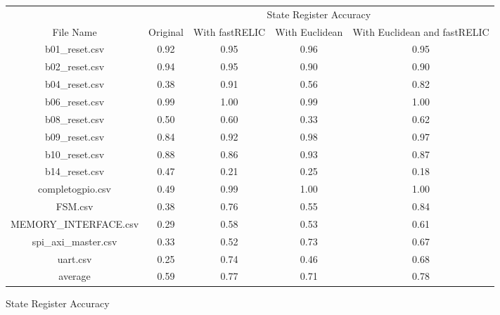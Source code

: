 \bigskip\begin{tabular}{|c|c|c|c|c|}
    \hline
     & \multicolumn{4}{c|}{State Register Accuracy }\\
    \cline {2-5}
    File Name & Original & With fastRELIC & With Euclidean & With Euclidean and fastRELIC\\
    \hline
    \hline
    b01\_reset.csv & 0.92 & 0.95 & 0.96 & 0.95\\
    \hline
    b02\_reset.csv & 0.94 & 0.95 & 0.90 & 0.90\\
    \hline
    b04\_reset.csv & 0.38 & 0.91 & 0.56 & 0.82\\
    \hline
    b06\_reset.csv & 0.99 & 1.00 & 0.99 & 1.00\\
    \hline
    b08\_reset.csv & 0.50 & 0.60 & 0.33 & 0.62\\
    \hline
    b09\_reset.csv & 0.84 & 0.92 & 0.98 & 0.97\\
    \hline
    b10\_reset.csv & 0.88 & 0.86 & 0.93 & 0.87\\
    \hline
    b14\_reset.csv & 0.47 & 0.21 & 0.25 & 0.18\\
    \hline
    completogpio.csv & 0.49 & 0.99 & 1.00 & 1.00\\
    \hline
    FSM.csv & 0.38 & 0.76 & 0.55 & 0.84\\
    \hline
    MEMORY\_INTERFACE.csv & 0.29 & 0.58 & 0.53 & 0.61\\
    \hline
    spi\_axi\_master.csv & 0.33 & 0.52 & 0.73 & 0.67\\
    \hline
    uart.csv & 0.25 & 0.74 & 0.46 & 0.68\\
    \hline
    \hline
    average & 0.59 & 0.77 & 0.71 & 0.78\\
    \hline
\end{tabular}
\caption{State Register Accuracy}
\label{tab:State Register Accuracy No Feature Selection}